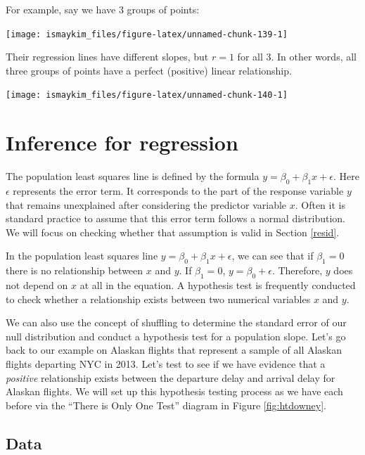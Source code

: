 \documentclass[]{tufte-book}
\begin{document}
For example, say we have 3 groups of points:

\begin{center}\texttt{[image: ismaykim\_files/figure-latex/unnamed-chunk-139-1]} \end{center}

Their regression lines have different slopes, but \(r = 1\) for all 3.
In other words, all three groups of points have a perfect (positive)
linear relationship.

\begin{center}\texttt{[image: ismaykim\_files/figure-latex/unnamed-chunk-140-1]} \end{center}

\section{Inference for regression}\label{inference-for-regression}

The population least squares line is defined by the formula
\(y = \beta_0 + \beta_1 x + \epsilon\). Here \(\epsilon\) represents the
error term. It corresponds to the part of the response variable \(y\)
that remains unexplained after considering the predictor variable \(x\).
Often it is standard practice to assume that this error term follows a
normal distribution. We will focus on checking whether that assumption
is valid in Section \ref{resid}.

In the population least squares line
\(y = \beta_0 + \beta_1 x + \epsilon\), we can see that if
\(\beta_1 = 0\) there is no relationship between \(x\) and \(y\). If
\(\beta_1 = 0\), \(y = \beta_0 + \epsilon\). Therefore, \(y\) does not
depend on \(x\) at all in the equation. A hypothesis test is frequently
conducted to check whether a relationship exists between two numerical
variables \(x\) and \(y\).

We can also use the concept of shuffling to determine the standard error
of our null distribution and conduct a hypothesis test for a population
slope. Let's go back to our example on Alaskan flights that represent a
sample of all Alaskan flights departing NYC in 2013. Let's test to see
if we have evidence that a \emph{positive} relationship exists between
the departure delay and arrival delay for Alaskan flights. We will set
up this hypothesis testing process as we have each before via the
``There is Only One Test'' diagram in Figure \ref{fig:htdowney}.

\subsection{Data}\label{data-2}
\end{document}
